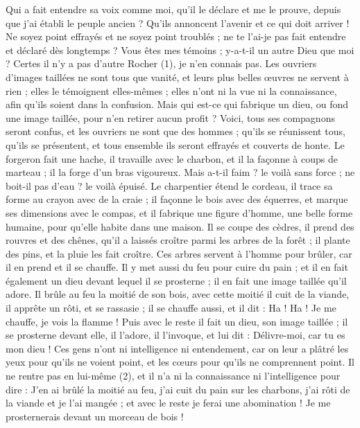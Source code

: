 \begin{multicols}{2}
Qui a fait entendre sa voix comme moi, qu’il le déclare et me le prouve, depuis que j’ai établi le peuple ancien ? Qu’ils annoncent l’avenir et ce qui doit arriver !
Ne soyez point effrayés et ne soyez point troublés ; ne te l'ai-je pas fait entendre et déclaré dès longtemps ? Vous êtes mes témoins ; y-a-t-il un autre Dieu que moi ? Certes il n'y a pas d'autre Rocher (1), je n'en connais pas.
Les ouvriers d’images taillées ne sont tous que vanité, et leurs plus belles œuvres ne servent à rien ; elles le témoignent elles-mêmes ; elles n’ont ni la vue ni la connaissance, afin qu'ils soient dans la confusion.
Mais qui est-ce qui fabrique un dieu, ou fond une image taillée, pour n'en retirer aucun profit ?
Voici, tous ses compagnons seront confus, et les ouvriers ne sont que des hommes ; qu’ils se réunissent tous, qu’ils se présentent, et tous ensemble ils seront effrayés et couverts de honte.
Le forgeron fait une hache, il travaille avec le charbon, et il la façonne à coups de marteau ; il la forge d’un bras vigoureux. Mais a-t-il faim ? le voilà sans force ; ne boit-il pas d’eau ? le voilà épuisé.
Le charpentier étend le cordeau, il trace sa forme au crayon avec de la craie ; il façonne le bois avec des équerres, et marque ses dimensions avec le compas, et il fabrique une figure d’homme, une belle forme humaine, pour qu’elle habite dans une maison.
Il se coupe des cèdres, il prend des rouvres et des chênes, qu'il a laissés croître parmi les arbres de la forêt ; il plante des pins, et la pluie les fait croître.
Ces arbres servent à l'homme pour brûler, car il en prend et il se chauffe. Il y met aussi du feu pour cuire du pain ; et il en fait également un dieu devant lequel il se prosterne ; il en fait une image taillée qu’il adore.
Il brûle au feu la moitié de son bois, avec cette moitié il cuit de la viande, il apprête un rôti, et se rassasie ; il se chauffe aussi, et il dit : Ha ! Ha ! Je me chauffe, je vois la flamme !
Puis avec le reste il fait un dieu, son image taillée ; il se prosterne devant elle, il l’adore, il l’invoque, et lui dit : Délivre-moi, car tu es mon dieu !
Ces gens n’ont ni intelligence ni entendement, car on leur a plâtré les yeux pour qu'ils ne voient point, et les cœurs pour qu'ils ne comprennent point.
Il ne rentre pas en lui-même (2), et il n’a ni la connaissance ni l’intelligence pour dire : J’en ai brûlé la moitié au feu, j’ai cuit du pain sur les charbons, j’ai rôti de la viande et je l’ai mangée ; et avec le reste je ferai une abomination ! Je me prosternerais devant un morceau de bois !

\end{multicols}
